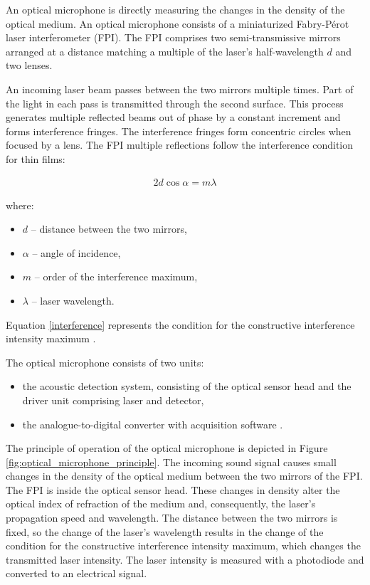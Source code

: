 An optical microphone is directly measuring the changes in the density of the optical medium. An optical microphone consists of a miniaturized Fabry-Pérot laser interferometer (FPI). The FPI comprises two semi-transmissive mirrors arranged at a distance matching a multiple of the laser’s half-wavelength $d$ and two lenses.

An incoming laser beam passes between the two mirrors multiple times. Part of the light in each pass is transmitted through the second surface. This process generates multiple reflected beams out of phase by a constant increment and forms interference fringes. The interference fringes form concentric circles when focused by a lens. The FPI multiple reflections follow the interference condition for thin films:

\begin{gather} \label{interference}
2d\cos\alpha = m\lambda
\end{gather} 

where:

\begin{itemize}

    \item $d$ -- distance between the two mirrors,
    \item $\alpha$ -- angle of incidence,
    \item $m$ -- order of the interference maximum,
    \item $\lambda$ -- laser wavelength.
    
\end{itemize}

Equation \ref{interference} represents the condition for the constructive interference intensity maximum \cite{fpi}.

 The optical microphone consists of two units:

\begin{itemize}
 
    \item the acoustic detection system, consisting of the optical sensor head and the driver unit comprising laser and detector,

    \item the analogue-to-digital converter with acquisition software \cite{fischer_rohringer_panzer_hecker_2017}.

\end{itemize}

 The principle of operation of the optical microphone is depicted in Figure \ref{fig:optical_microphone_principle}. The incoming sound signal causes small changes in the density of the optical medium between the two mirrors of the FPI. The FPI is inside the optical sensor head. These changes in density alter the optical index of refraction of the medium and, consequently, the laser’s propagation speed and wavelength. The distance between the two mirrors is fixed, so the change of the laser’s wavelength results in the change of the condition for the constructive interference intensity maximum, which changes the transmitted laser intensity. The laser intensity is measured with a photodiode and converted to an electrical signal.

